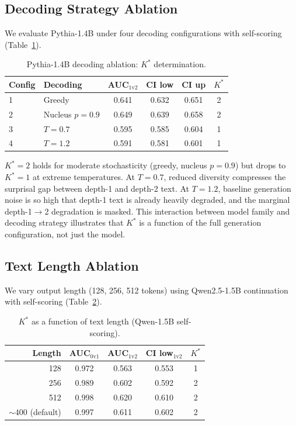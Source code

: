 \documentclass[11pt,a4paper]{article}
\newcommand{\kstar}{K^{*}}
\begin{document}
\subsection{Decoding Strategy Ablation}
\label{sec:decoding}

We evaluate Pythia-1.4B under four decoding configurations with self-scoring (Table~\ref{tab:decoding}).

\begin{table}[t]
\centering
\small
\caption{Pythia-1.4B decoding ablation: $\kstar$ determination.}
\label{tab:decoding}
\begin{tabular}{llcccc}
\toprule
Config & Decoding & AUC$_{1\text{v}2}$ & CI low & CI up & $\kstar$ \\
\midrule
1 & Greedy & 0.641 & 0.632 & 0.651 & 2 \\
2 & Nucleus $p{=}0.9$ & 0.649 & 0.639 & 0.658 & 2 \\
3 & $T{=}0.7$ & 0.595 & 0.585 & 0.604 & 1 \\
4 & $T{=}1.2$ & 0.591 & 0.581 & 0.601 & 1 \\
\bottomrule
\end{tabular}
\end{table}

$\kstar = 2$ holds for moderate stochasticity (greedy, nucleus $p = 0.9$) but drops to $\kstar = 1$ at extreme temperatures.
At $T = 0.7$, reduced diversity compresses the surprisal gap between depth-1 and depth-2 text.
At $T = 1.2$, baseline generation noise is so high that depth-1 text is already heavily degraded, and the marginal depth-1$\to$2 degradation is masked.
This interaction between model family and decoding strategy illustrates that $\kstar$ is a function of the full generation configuration, not just the model.

\subsection{Text Length Ablation}
\label{sec:length}

We vary output length (128, 256, 512 tokens) using Qwen2.5-1.5B continuation with self-scoring (Table~\ref{tab:length}).

\begin{table}[t]
\centering
\small
\caption{$\kstar$ as a function of text length (Qwen-1.5B self-scoring).}
\label{tab:length}
\begin{tabular}{rcccc}
\toprule
Length & AUC$_{0\text{v}1}$ & AUC$_{1\text{v}2}$ & CI low$_{1\text{v}2}$ & $\kstar$ \\
\midrule
128 & 0.972 & 0.563 & 0.553 & 1 \\
256 & 0.989 & 0.602 & 0.592 & 2 \\
512 & 0.998 & 0.620 & 0.610 & 2 \\
${\sim}400$ (default) & 0.997 & 0.611 & 0.602 & 2 \\
\bottomrule
\end{tabular}
\end{table}
\end{document}
